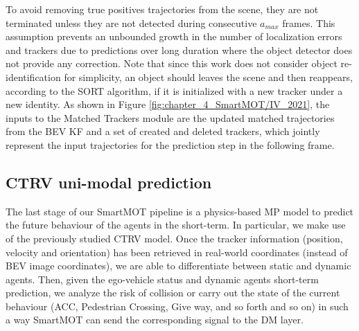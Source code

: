 To avoid removing true positives trajectories from the scene, they are not terminated unless they are not detected during consecutive $a_{max}$ frames. This assumption prevents an unbounded growth in the number of localization errors and trackers due to predictions over long duration where the object detector does not provide any correction. Note that since this work does not consider object re-identification for simplicity, an object should leaves the scene and then reappears, according to the \ac{SORT} algorithm, if it is initialized with a new tracker under a new identity. As shown in Figure \ref{fig:chapter_4_SmartMOT/IV_2021}, the inputs to the Matched Trackers module are the updated matched trajectories from the \ac{BEV} \ac{KF} and a set of created and deleted trackers, which jointly represent the input trajectories for the prediction step in the following frame.

\subsection{\ac{CTRV} uni-modal prediction}
\label{subsec:4_smartmot_ctrv_prediction}

The last stage of our SmartMOT pipeline is a physics-based \ac{MP} model to predict the future behaviour of the agents in the short-term. In particular, we make use of the previously studied \ac{CTRV} model. Once the tracker information (position, velocity and orientation) has been retrieved in real-world coordinates (instead of \ac{BEV} image coordinates), we are able to differentiate between static and dynamic agents. Then, given the ego-vehicle status and dynamic agents short-term prediction, we analyze the risk of collision or carry out the state of the current behaviour (\ac{ACC}, Pedestrian Crossing, Give way, and so forth and so on) in such a way SmartMOT can send the corresponding signal to the \ac{DM} layer. %
\begin{comment}
\begin{figure}[] 
	\centering
	\texttt{[image: chapter\_4\_SmartMOT/filtering\_process\_example.jpg]}
	\captionsetup{justification=justified}
	\caption[Simulation use case of SmartMOT in the \ac{CARLA} simulator]{Simulation use case of SmartMOT in the \ac{CARLA} simulator: Non-relevant objects are filtered by means of the monitored lanes-based attention module. Nevertheless, \acfp{VRU} are considered on the sidewalk if they are close enough to the closest segment of the corresponding monitored lane.}
	\label{fig:chapter_4_SmartMOT/filtering_process_example}
\end{figure} 
\end{comment}

